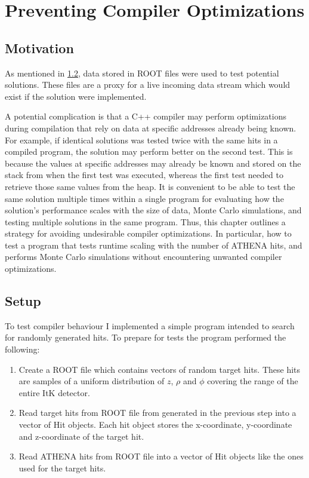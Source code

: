 \section{Preventing Compiler Optimizations}
\label{sec:Preventing Compiler Optimizations}

\subsection{Motivation}
As mentioned in \ref{}, data stored in ROOT files were used to test potential solutions. These files are a proxy for a live incoming data stream which would exist if the solution were implemented. 

A potential complication is that a C++ compiler may perform optimizations during compilation that rely on data at specific addresses already being known. For example, if identical solutions was tested twice with the same hits in a compiled program, the solution may perform better on the second test. This is because the values at specific addresses may already be known and stored on the stack from when the first test was executed, whereas the first test needed to retrieve those same values from the heap. It is convenient to be able to test the same solution multiple times within a single program for evaluating how the solution’s performance scales with the size of data, Monte Carlo simulations, and testing multiple solutions in the same program. Thus, this chapter outlines a strategy for avoiding undesirable compiler optimizations. In particular, how to test a program that tests runtime scaling with the number of ATHENA hits, and performs Monte Carlo simulations without encountering unwanted compiler optimizations.

\subsection{Setup}
To test compiler behaviour I implemented a simple program intended to search for randomly generated hits. To prepare for tests the program performed the following: 
\begin{enumerate}
    \item Create a ROOT file which contains vectors of random target hits. These hits are samples of a uniform distribution of $z$, $\rho$ and $\phi$ covering the range of the entire ItK detector.
    \item Read target hits from ROOT file from generated in the previous step into a vector of Hit objects. Each hit object stores the x-coordinate, y-coordinate and z-coordinate of the target hit.
    \item Read ATHENA hits from ROOT file into a vector of Hit objects like the ones used for the target hits.
\end{enumerate}

